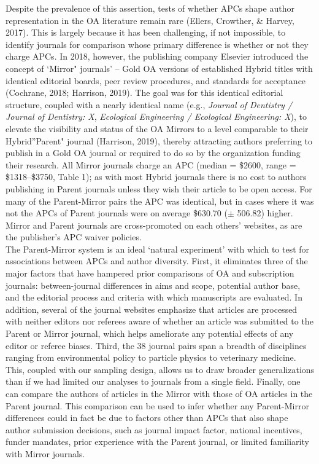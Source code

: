 \documentclass[
  english,
  man]{apa6}
\begin{document}
Despite the prevalence of this assertion, tests of whether APCs shape author representation in the OA literature remain rare (Ellers, Crowther, \& Harvey, 2017). This is largely because it has been challenging, if not impossible, to identify journals for comparison whose primary difference is whether or not they charge APCs. In 2018, however, the publishing company Elsevier introduced the concept of `Mirror" journals' -- Gold OA versions of established Hybrid titles with identical editorial boards, peer review procedures, and standards for acceptance (Cochrane, 2018; Harrison, 2019). The goal was for this identical editorial structure, coupled with a nearly identical name (e.g., \emph{Journal of Dentistry / Journal of Dentistry: X}, \emph{Ecological Engineering / Ecological Engineering: X}), to elevate the visibility and status of the OA Mirrors to a level comparable to their Hybrid''Parent" journal (Harrison, 2019), thereby attracting authors preferring to publish in a Gold OA journal or required to do so by the organization funding their research. All Mirror journals charge an APC (median = \$2600, range = \$1318--\$3750, Table 1); as with most Hybrid journals there is no cost to authors publishing in Parent journals unless they wish their article to be open access. For many of the Parent-Mirror pairs the APC was identical, but in cases where it was not the APCs of Parent journals were on average \$630.70 (\(\pm\) 506.82) higher. Mirror and Parent journals are cross-promoted on each others' websites, as are the publisher's APC waiver policies.\\
The Parent-Mirror system is an ideal `natural experiment' with which to test for associations between APCs and author diversity. First, it eliminates three of the major factors that have hampered prior comparisons of OA and subscription journals: between-journal differences in aims and scope, potential author base, and the editorial process and criteria with which manuscripts are evaluated. In addition, several of the journal websites emphasize that articles are processed with neither editors nor referees aware of whether an article was submitted to the Parent or Mirror journal, which helps ameliorate any potential effects of any editor or referee biases. Third, the 38 journal pairs span a breadth of disciplines ranging from environmental policy to particle physics to veterinary medicine. This, coupled with our sampling design, allows us to draw broader generalizations than if we had limited our analyses to journals from a single field. Finally, one can compare the authors of articles in the Mirror with those of OA articles in the Parent journal. This comparison can be used to infer whether any Parent-Mirror differences could in fact be due to factors other than APCs that also shape author submission decisions, such as journal impact factor, national incentives, funder mandates, prior experience with the Parent journal, or limited familiarity with Mirror journals.\\
\end{document}
